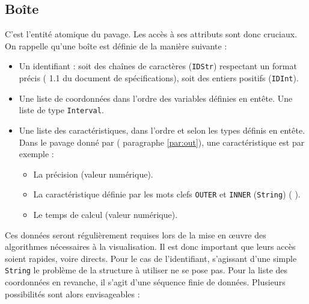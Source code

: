 \subsection{Boîte}
C'est l'entité atomique du pavage. Les accès à ses attributs sont donc cruciaux. On rappelle qu'une boîte est définie de la manière suivante : 
\begin{itemize}
\item 
  Un identifiant : soit des chaînes de caractères (\verb+IDStr+) respectant un format précis (\cf{} 1.1 du document de spécifications), soit des entiers positifs (\verb+IDInt+).
\item
  Une liste de coordonnées dans l'ordre des variables définies en entête. Une liste de type \verb+Interval+.
\item
  Une liste des caractéristiques, dans l'ordre et selon les types définis en entête. Dans le pavage donné par \realpaver{} (\cf{} paragraphe \ref{par:out}), une caractéristique est par exemple : 
  \begin{itemize}
\item La précision (valeur numérique).
\item La caractéristique définie par les mots clefs \verb+OUTER+ et \verb+INNER+ (\verb+String+) (\cf{} \cite{man}).
\item Le temps de calcul (valeur numérique).
  \end{itemize}
\end{itemize}
Ces données seront régulièrement requises lors de la mise en œuvre des algorithmes nécessaires à la visualisation. Il est donc important que leurs accès soient rapides, voire directs. Pour le cas de l'identifiant, s'agissant d'une simple \verb+String+ le problème de la structure à utiliser ne se pose pas. Pour la liste des coordonnées en revanche, il s'agit d'une séquence finie de données. Plusieurs possibilités sont alors envisageables : 

